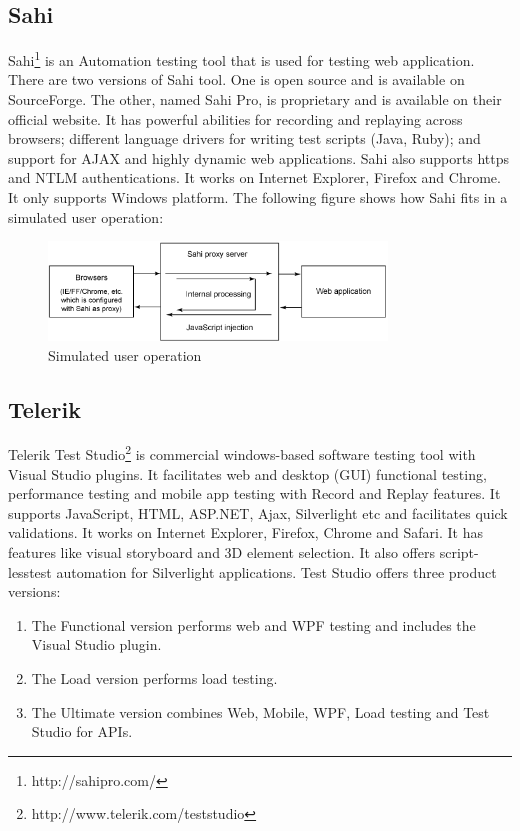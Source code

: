 \documentclass[12pt,journal]{IEEEtran}
\begin{document}
\subsection{Sahi}
Sahi\footnote{http://sahipro.com/} is an Automation testing tool that is used for testing web application. There are two versions of Sahi tool. One is open source and is available on SourceForge. The other, named Sahi Pro, is proprietary and is available on their official website. It has powerful abilities for recording and replaying across browsers; different language drivers for writing test scripts (Java, Ruby); and support for AJAX and highly dynamic web applications. Sahi also supports https and NTLM authentications. It works on Internet Explorer, Firefox and Chrome. It only supports Windows platform. The following figure shows how Sahi fits in a simulated user operation:
\begin{figure}[h!]
 \hfill\includegraphics[width=9cm]{figures/sahi.PNG}\hspace*{\fill}
 \caption{Simulated user operation}
 \label{fig}
\end{figure}

\subsection{Telerik}
Telerik Test Studio\footnote{http://www.telerik.com/teststudio} is commercial windows-based software testing tool with Visual Studio plugins. It facilitates web and desktop (GUI) functional testing, performance testing and mobile app testing with Record and Replay features. It supports JavaScript, HTML, ASP.NET, Ajax, Silverlight etc and facilitates quick validations. It works on Internet Explorer, Firefox, Chrome and Safari. It has features like visual storyboard and 3D element selection. It also offers script-lesstest automation for Silverlight applications. Test Studio offers three product versions:
\begin{enumerate}
\item The Functional version performs web and WPF testing and includes the Visual Studio plugin.
\item The Load version performs load testing.
\item The Ultimate version combines Web, Mobile, WPF, Load testing and Test Studio for APIs.
\end{enumerate}
\end{document}
